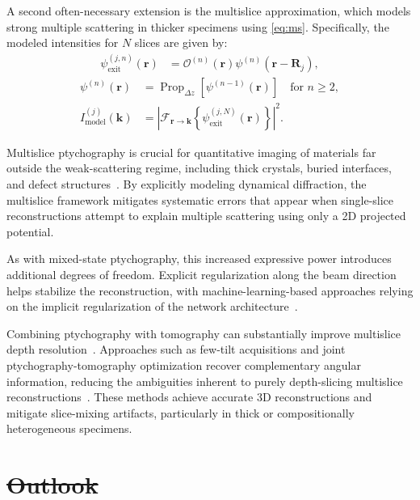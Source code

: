 \documentclass[pdflatex,sn-aps,iicol]{sn-jnl}%
\makeatletter
\providecommand{\DIFaddtex}[1]{{\protect\color{blue}\uwave{#1}}} %
\providecommand{\DIFdeltex}[1]{{\protect\color{red}\sout{#1}}} %
\providecommand{\DIFaddbegin}{} %
\providecommand{\DIFaddend}{} %
\providecommand{\DIFdelbegin}{} %
\providecommand{\DIFdelend}{} %
\providecommand{\DIFadd}[1]{\texorpdfstring{\DIFaddtex{#1}}{#1}} %
\providecommand{\DIFdel}[1]{\texorpdfstring{\DIFdeltex{#1}}{}} %
\newcommand{\DIFscaledelfig}{0.5}
\newlength{\DIFdelgraphicswidth} %
\newlength{\DIFdelgraphicsheight} %
\newcommand{\DIFaddincludegraphics}[2][]{{\color{blue}\fbox{\DIFOincludegraphics[#1]{#2}}}} %
\newcommand{\DIFdelincludegraphics}[2][]{%
\sbox{\DIFdelgraphicsbox}{\DIFOincludegraphics[#1]{#2}}%
\settoboxwidth{\DIFdelgraphicswidth}{\DIFdelgraphicsbox} %
\settoboxtotalheight{\DIFdelgraphicsheight}{\DIFdelgraphicsbox} %
\scalebox{\DIFscaledelfig}{%
\parbox[b]{\DIFdelgraphicswidth}{\usebox{\DIFdelgraphicsbox}\\[-\baselineskip] \rule{\DIFdelgraphicswidth}{0em}}\llap{\resizebox{\DIFdelgraphicswidth}{\DIFdelgraphicsheight}{%
\setlength{\unitlength}{\DIFdelgraphicswidth}%
\begin{picture}(1,1)%
\thicklines\linethickness{2pt} %
{\color[rgb]{1,0,0}\put(0,0){\framebox(1,1){}}}%
{\color[rgb]{1,0,0}\put(0,0){\line( 1,1){1}}}%
{\color[rgb]{1,0,0}\put(0,1){\line(1,-1){1}}}%
\end{picture}%
}\hspace*{3pt}}} %
} %
\DeclareRobustCommand{\DIFaddbegin}{\DIFOaddbegin \let\includegraphics\DIFaddincludegraphics} %
\DeclareRobustCommand{\DIFaddend}{\DIFOaddend \let\includegraphics\DIFOincludegraphics} %
\DeclareRobustCommand{\DIFdelbegin}{\DIFOdelbegin \let\includegraphics\DIFdelincludegraphics} %
\DeclareRobustCommand{\DIFdelend}{\DIFOaddend \let\includegraphics\DIFOincludegraphics} %
\let\sout@orig\sout %
\renewcommand{\sout}[1]{\ifmmode\text{\sout@orig{\ensuremath{#1}}}\else\sout@orig{#1}\fi} %
\makeatother
\begin{document}
A second often-necessary extension is the multislice approximation, which models strong multiple scattering in thicker specimens using \cref{eq:ms}.
Specifically, the modeled intensities for $N$ slices are given by:
\begin{align}
\psi_{\text{exit}}^{(j,n)}(\boldsymbol{r})
&=
\mathcal{O}^{(n)}(\boldsymbol{r})
\psi^{(n)}(\boldsymbol{r}-\boldsymbol{R}_j),
\label{eq:multi-slice-01}
\end{align}
\begin{align}
\psi^{(n)}(\boldsymbol{r})
&=
\operatorname{Prop}_{\Delta z}
\left[
\psi^{(n-1)}(\boldsymbol{r})
\right]
\quad \text{for } n \geq 2,\\
I_{\text{model}}^{(j)}(\boldsymbol{k})
&=
\left\lvert
\mathcal{F}_{\boldsymbol{r}\to\boldsymbol{k}}
\left\{
\psi_{\text{exit}}^{(j,N)}(\boldsymbol{r})
\right\}
\right\rvert^2.
\label{eq:multi-slice-02}
\end{align}

Multislice ptychography is crucial for quantitative imaging of materials far outside the weak-scattering regime, including thick crystals, buried interfaces, and defect structures~\cite{Ribet_2024}.
By explicitly modeling dynamical diffraction, the multislice framework mitigates systematic errors that appear when single-slice reconstructions attempt to explain multiple scattering using only a 2D projected potential.

As with mixed-state ptychography, this increased expressive power introduces additional degrees of freedom.
Explicit regularization along the beam direction helps stabilize the reconstruction, with machine-learning-based approaches relying on the implicit regularization of the network architecture~\cite{McCray_2025}.

Combining ptychography with tomography can substantially improve multislice depth resolution~\cite{chen2024imaging,allars2025depth}.
Approaches such as few-tilt acquisitions and joint ptychography-tomography optimization recover complementary angular information, reducing the ambiguities inherent to purely depth-slicing multislice reconstructions~\cite{Lee_2023,You_2024,Dong_2025}.
These methods achieve accurate 3D reconstructions and mitigate slice-mixing artifacts, particularly in thick or compositionally heterogeneous specimens.

\DIFdelbegin \section{\DIFdel{Outlook}}
\addtocounter{section}{-1}%
\DIFdelend \DIFaddbegin \section*{\DIFadd{Outlook and conclusions}}
\DIFaddend 
\end{document}
